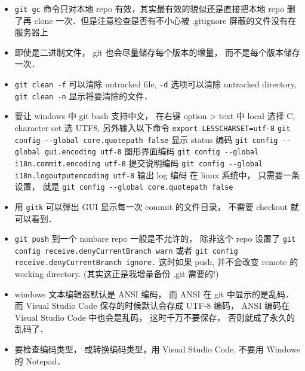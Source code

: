 \begin{itemize}
\item \verb|git gc| 命令只对本地 repo 有效，其实最有效的貌似还是直接把本地 repo 删了再 clone 一次．但是注意检查是否有不小心被 .gitignore 屏蔽的文件没有在服务器上
\item 即使是二进制文件， git 也会尽量储存每个版本的增量， 而不是每个版本储存一次．
\item \verb|git clean -f| 可以清除 untracked file, \verb|-d| 选项可以清除 untracked directory,  \verb|git clean -n| 显示将要清除的文件．
\item 要让 windows 中 git bash 支持中文， 在右键 option > text 中 local 选择 C, character set 选 UTF8, 另外输入以下命令
\verb|export LESSCHARSET=utf-8|
\verb|git config --global core.quotepath false|     显示 status 编码
\verb|git config --global gui.encoding utf-8|    图形界面编码
\verb|git config --global i18n.commit.encoding utf-8|   提交说明编码
\verb|git config --global i18n.logoutputencoding utf-8| 输出 log 编码
在 linux 系统中， 只需要一条设置， 就是
\verb|git config --global core.quotepath false|
\item 用 \verb|gitk| 可以弹出 GUI 显示每一次 commit 的文件目录， 不需要 checkout 就可以看到．
\item \verb|git push| 到一个 nonbare repo 一般是不允许的， 除非这个 repo 设置了 \verb|git config receive.denyCurrentBranch warn| 或者 \verb|git config receive.denyCurrentBranch ignore.| 这时如果 push, 并不会改变 remote 的 working directory. (其实这正是我增量备份 .git 需要的!)
\item windows 文本编辑器默认是 ANSI 编码， 而 ANSI 在 git 中显示的是乱码． 而 Visual Studio Code 保存的时候默认会存成 UTF-8 编码， ANSI 编码在 Visual Studio Code 中也会是乱码， 这时千万不要保存， 否则就成了永久的乱码了．
\item 要检查编码类型， 或转换编码类型，用 Visual Studio Code.  不要用 Windows 的 Notepad．
\end{itemize}
